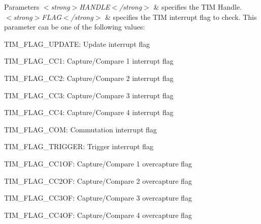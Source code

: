 \begin{DoxyParams}{Parameters}
{\em $<$strong$>$\-H\-A\-N\-D\-L\-E$<$/strong$>$} & specifies the T\-I\-M Handle. \\
\hline
{\em $<$strong$>$\-F\-L\-A\-G$<$/strong$>$} & specifies the T\-I\-M interrupt flag to check. This parameter can be one of the following values\-: \begin{DoxyItemize}
\item T\-I\-M\-\_\-\-F\-L\-A\-G\-\_\-\-U\-P\-D\-A\-T\-E\-: Update interrupt flag \item T\-I\-M\-\_\-\-F\-L\-A\-G\-\_\-\-C\-C1\-: Capture/\-Compare 1 interrupt flag \item T\-I\-M\-\_\-\-F\-L\-A\-G\-\_\-\-C\-C2\-: Capture/\-Compare 2 interrupt flag \item T\-I\-M\-\_\-\-F\-L\-A\-G\-\_\-\-C\-C3\-: Capture/\-Compare 3 interrupt flag \item T\-I\-M\-\_\-\-F\-L\-A\-G\-\_\-\-C\-C4\-: Capture/\-Compare 4 interrupt flag \item T\-I\-M\-\_\-\-F\-L\-A\-G\-\_\-\-C\-O\-M\-: Commutation interrupt flag \item T\-I\-M\-\_\-\-F\-L\-A\-G\-\_\-\-T\-R\-I\-G\-G\-E\-R\-: Trigger interrupt flag \item T\-I\-M\-\_\-\-F\-L\-A\-G\-\_\-\-C\-C1\-O\-F\-: Capture/\-Compare 1 overcapture flag \item T\-I\-M\-\_\-\-F\-L\-A\-G\-\_\-\-C\-C2\-O\-F\-: Capture/\-Compare 2 overcapture flag \item T\-I\-M\-\_\-\-F\-L\-A\-G\-\_\-\-C\-C3\-O\-F\-: Capture/\-Compare 3 overcapture flag \item T\-I\-M\-\_\-\-F\-L\-A\-G\-\_\-\-C\-C4\-O\-F\-: Capture/\-Compare 4 overcapture flag \end{DoxyItemize}
\\
\hline
\end{DoxyParams}

